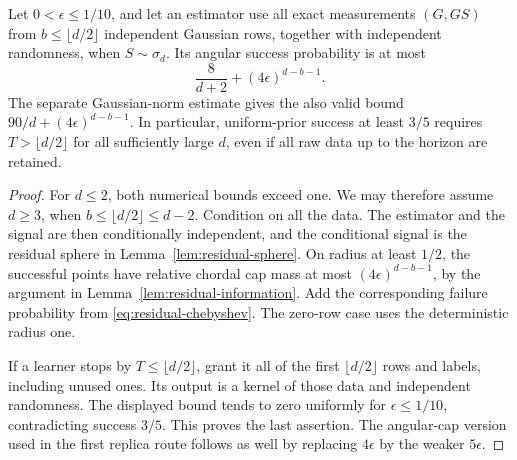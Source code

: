 \begin{lemma}\label{lem:raw-sample-bound}
Let $0<\epsilon\le1/10$, and let an estimator use all exact measurements
$(G,GS)$ from $b\le\lfloor d/2\rfloor$ independent Gaussian rows, together
with independent randomness, when $S\sim\sigma_d$. Its angular success
probability is at most
\begin{equation}\label{eq:raw-sample-bound}
 \frac{8}{d+2}+(4\epsilon)^{d-b-1}.
\end{equation}
The separate Gaussian-norm estimate gives the also valid bound
$90/d+(4\epsilon)^{d-b-1}$. In particular, uniform-prior success at least
$3/5$ requires $T>\lfloor d/2\rfloor$ for all sufficiently large $d$,
even if all raw data up to the horizon are retained.
\end{lemma}

\begin{proof}
For $d\le2$, both numerical bounds exceed one. We may therefore assume
$d\ge3$, when $b\le\lfloor d/2\rfloor\le d-2$.
Condition on all the data. The estimator and the signal are then
conditionally independent, and the conditional signal is the residual
sphere in Lemma~\ref{lem:residual-sphere}. On radius at least $1/2$,
the successful points have relative chordal cap mass at most
$(4\epsilon)^{d-b-1}$, by the argument in
Lemma~\ref{lem:residual-information}. Add the corresponding failure
probability from \eqref{eq:residual-chebyshev}. The zero-row case uses
the deterministic radius one.

If a learner stops by $T\le\lfloor d/2\rfloor$, grant it all of the first
$\lfloor d/2\rfloor$ rows and labels, including unused ones. Its output is
a kernel of those data and independent randomness. The displayed bound
tends to zero uniformly for $\epsilon\le1/10$, contradicting success
$3/5$. This proves the last assertion. The angular-cap version used in
the first replica route follows as well by replacing $4\epsilon$ by
the weaker $5\epsilon$.
\end{proof}
